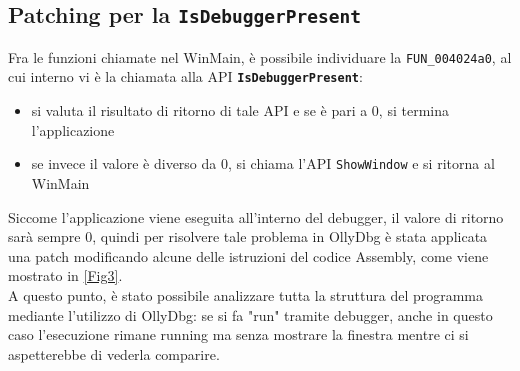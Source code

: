 \documentclass{article}
\begin{document}
\subsection{Patching per la \texttt{IsDebuggerPresent}}
Fra le funzioni chiamate nel WinMain, è possibile individuare la \texttt{FUN\_004024a0}, al cui interno vi è la chiamata alla API \textbf{\texttt{IsDebuggerPresent}}:
\begin{itemize}
\item si valuta il risultato di ritorno di tale API e se è pari a 0, si termina l'applicazione
\item se invece il valore è diverso da 0, si chiama l'API \texttt{ShowWindow} e si ritorna al WinMain
\end{itemize}
Siccome l'applicazione viene eseguita all'interno del debugger, il valore di ritorno sarà sempre 0, quindi per risolvere tale problema in OllyDbg è stata applicata una patch modificando alcune delle istruzioni del codice Assembly, come viene mostrato in \ref{Fig3}.\\A questo punto, è stato possibile analizzare tutta la struttura del programma mediante l'utilizzo di OllyDbg: se si fa "run" tramite debugger, anche in questo caso l'esecuzione rimane running ma senza mostrare la finestra mentre ci si aspetterebbe di vederla comparire.
\end{document}
